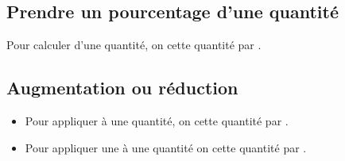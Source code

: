 \documentclass[12pt,a4paper]{article}
\begin{document}


\subsection{Prendre un pourcentage d'une quantité}
\begin{mymeth}
	Pour calculer  d'une quantité, on  cette quantité par .
	
\end{mymeth}



\subsection{Augmentation ou réduction}

\begin{mymeth}
	\begin{itemize}
		\item Pour appliquer   à une quantité, on  cette quantité par . 
		
		\item  Pour appliquer une   à une quantité  on  cette quantité par .
	\end{itemize}	
\end{mymeth}	


\end{document}
